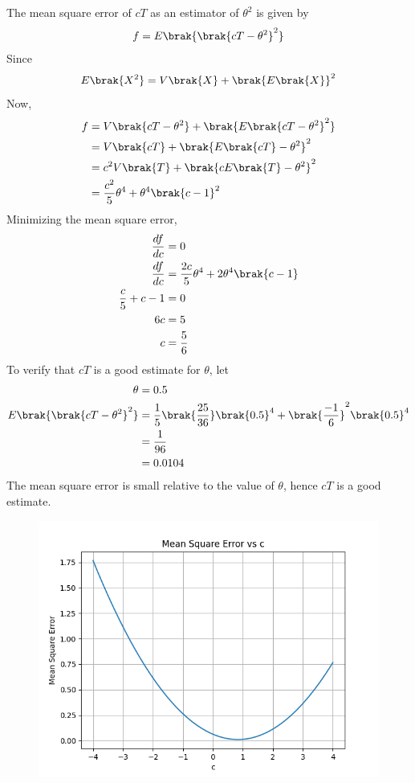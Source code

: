 \documentclass[journal,12pt,onecolumn]{IEEEtran}
\theoremstyle{remark}
\begin{document}
The mean square error of $cT$ as an estimator of $\theta^2$ is given by
\begin{align}
	f = E\brak{\brak{cT - \theta^2}^2}
\end{align}
Since
\begin{align}
	E\brak{X^2} = V\brak{X} + \brak{E\brak{X}}^2
\end{align}
Now,
\begin{align}
	f &= V\brak{cT - \theta^2} + \brak{E\brak{cT - \theta^2}^2}\\
	&= V\brak{cT} + \brak{E\brak{cT} - \theta^2}^2\\
	&= c^2V\brak{T} + \brak{cE\brak{T} - \theta^2}^2\\
	&= \frac{c^2}{5}\theta^4 + \theta^4\brak{c-1}^2
\end{align}
Minimizing the mean square error,
\begin{align}
	\frac{df}{dc} &= 0\\
	\frac{df}{dc} &= \frac{2c}{5}\theta^4 + 2\theta^4\brak{c-1}\\
	\frac{c}{5} + c - 1 &= 0\\
	6c &= 5\\
	c &= \frac{5}{6}
\end{align}
To verify that $cT$ is a good estimate for $\theta$, let
\begin{align}
	\theta &= 0.5\\
	E\brak{\brak{cT - \theta^2}^2} &= \frac{1}{5}\brak{\frac{25}{36}}\brak{0.5}^4 + \brak{\frac{-1}{6}}^2\brak{0.5}^4\\
	&= \frac{1}{96}\\
	&= 0.0104
\end{align}
The mean square error is small relative to the value of $\theta$, hence $cT$ is a good estimate.
\\
\begin{figure}[!ht]
	\centering
	\includegraphics[width = \columnwidth]{./figs/fig1.png}
\end{figure}
\end{document}
